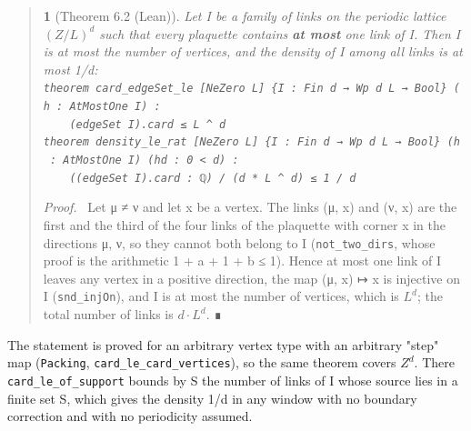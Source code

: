 \documentclass[11pt,a4paper]{article}
\theoremstyle{named}
\newtheorem*{namedthm}{}
\newenvironment{mdproof}[1][Proof]{\par\medskip\noindent\textit{#1.}\ }{\par\medskip}
\begin{document}
\begin{quote}
\begin{namedthm}[Theorem 6.2 (Lean)]
Let I be a family of links on the periodic lattice $(Z/L)^d$ such that every plaquette contains \textbf{at most} one link of I. Then \textbar{}I\textbar{} is at most the number of vertices, and the density of I among all links is at most 1/d:\\
\texttt{theorem\ \allowbreak{}card\_\allowbreak{}edgeSet\_\allowbreak{}le\ \allowbreak{}[NeZero\ \allowbreak{}L]\ \allowbreak{}\{I\ \allowbreak{}:\ \allowbreak{}Fin\ \allowbreak{}d\ \allowbreak{}→\ \allowbreak{}Wp\ \allowbreak{}d\ \allowbreak{}L\ \allowbreak{}→\ \allowbreak{}Bool\}\ \allowbreak{}(h\ \allowbreak{}:\ \allowbreak{}AtMostOne\ \allowbreak{}I)\ \allowbreak{}:}\\
\texttt{\ \allowbreak{}\ \allowbreak{}\ \allowbreak{}\ \allowbreak{}(edgeSet\ \allowbreak{}I).\allowbreak{}card\ \allowbreak{}≤\ \allowbreak{}L\ \allowbreak{}\textasciicircum{}\ \allowbreak{}d}\\
\texttt{theorem\ \allowbreak{}density\_\allowbreak{}le\_\allowbreak{}rat\ \allowbreak{}[NeZero\ \allowbreak{}L]\ \allowbreak{}\{I\ \allowbreak{}:\ \allowbreak{}Fin\ \allowbreak{}d\ \allowbreak{}→\ \allowbreak{}Wp\ \allowbreak{}d\ \allowbreak{}L\ \allowbreak{}→\ \allowbreak{}Bool\}\ \allowbreak{}(h\ \allowbreak{}:\ \allowbreak{}AtMostOne\ \allowbreak{}I)\ \allowbreak{}(hd\ \allowbreak{}:\ \allowbreak{}0\ \allowbreak{}\textless{}\ \allowbreak{}d)\ \allowbreak{}:}\\
\texttt{\ \allowbreak{}\ \allowbreak{}\ \allowbreak{}\ \allowbreak{}((edgeSet\ \allowbreak{}I).\allowbreak{}card\ \allowbreak{}:\ \allowbreak{}ℚ)\ \allowbreak{}/\ \allowbreak{}(d\ \allowbreak{}*\ \allowbreak{}L\ \allowbreak{}\textasciicircum{}\ \allowbreak{}d)\ \allowbreak{}≤\ \allowbreak{}1\ \allowbreak{}/\ \allowbreak{}d}
\end{namedthm}
\begin{mdproof}[Proof]
Let μ ≠ ν and let x be a vertex. The links (μ, x) and (ν, x) are the first and the third of the four links of the plaquette with corner x in the directions μ, ν, so they cannot both belong to I (\texttt{not\_\allowbreak{}two\_\allowbreak{}dirs}, whose proof is the arithmetic 1 + a + 1 + b ≤ 1). Hence at most one link of I leaves any vertex in a positive direction, the map (μ, x) ↦ x is injective on I (\texttt{snd\_\allowbreak{}injOn}), and \textbar{}I\textbar{} is at most the number of vertices, which is $L^d$; the total number of links is $d·L^d$. ∎
\end{mdproof}
\end{quote}
The statement is proved for an arbitrary vertex type with an arbitrary "step" map (\texttt{Packing}, \texttt{card\_\allowbreak{}le\_\allowbreak{}card\_\allowbreak{}vertices}), so the same theorem covers $Z^d$. There \texttt{card\_\allowbreak{}le\_\allowbreak{}of\_\allowbreak{}support} bounds by \textbar{}S\textbar{} the number of links of I whose source lies in a finite set S, which gives the density 1/d in any window with no boundary correction and with no periodicity assumed.
\end{document}
